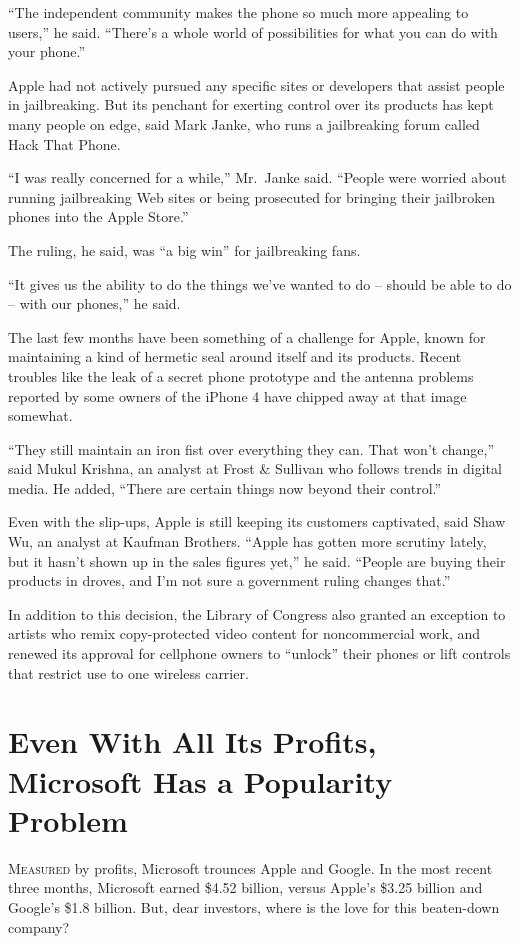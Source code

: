 ﻿\documentclass[12pt]{article}
\begin{document}
``The independent community makes the phone so much more appealing to users,'' he said. ``There's a
whole world of possibilities for what you can do with your phone.''

Apple had not actively pursued any specific sites or developers that assist people in jailbreaking.
But its penchant for exerting control over its products has kept many people on edge, said Mark
Janke, who runs a jailbreaking forum called Hack That Phone.

``I was really concerned for a while,'' Mr.~Janke said. ``People were worried about running
jailbreaking Web sites or being prosecuted for bringing their jailbroken phones into the Apple
Store.''

The ruling, he said, was ``a big win'' for jailbreaking fans.

``It gives us the ability to do the things we've wanted to do -- should be able to do -- with our
phones,'' he said.

The last few months have been something of a challenge for Apple, known for maintaining a kind of
hermetic seal around itself and its products. Recent troubles like the leak of a secret phone
prototype and the antenna problems reported by some owners of the iPhone 4 have chipped away at that
image somewhat.

``They still maintain an iron fist over everything they can. That won't change,'' said Mukul
Krishna, an analyst at Frost \& Sullivan who follows trends in digital media. He added, ``There are
certain things now beyond their control.''

Even with the slip-ups, Apple is still keeping its customers captivated, said Shaw Wu, an analyst at
Kaufman Brothers. ``Apple has gotten more scrutiny lately, but it hasn't shown up in the sales
figures yet,'' he said. ``People are buying their products in droves, and I'm not sure a government
ruling changes that.''

In addition to this decision, the Library of Congress also granted an exception to artists who remix
copy-protected video content for noncommercial work, and renewed its approval for cellphone owners
to ``unlock'' their phones or lift controls that restrict use to one wireless carrier.

\section{Even With All Its Profits, Microsoft Has a Popularity Problem}

\lettrine{M}{easured} by profits, Microsoft trounces Apple and Google. In
the most recent three months, Microsoft earned \$4.52 billion, versus Apple's \$3.25 billion and
Google's \$1.8 billion. But, dear investors, where is the love for this beaten-down company?
\end{document}
